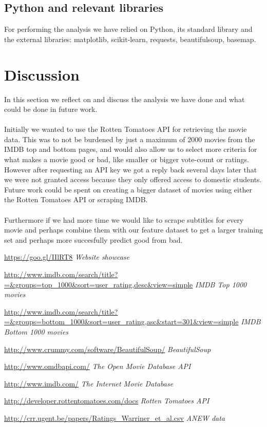 \documentclass{acm_proc_article-sp}
\begin{document}
\subsection{Python and relevant libraries}
For performing the analysis we have relied on Python, its standard library and the external libraries: matplotlib, scikit-learn, requests, beautifulsoup, basemap.

\section{Discussion}
In this section we reflect on and discuss the analysis we have done and what could be done in future work.\\\\
Initially we wanted to use the Rotten Tomatoes API\cite{tomatoes} for retrieving the movie data. This was to not be burdened by just a maximum of 2000 movies from the IMDB top and bottom pages, and would also allow us to select more criteria for what makes a movie good or bad, like smaller or bigger vote-count or ratings. However after requesting an API key we got a reply back several days later that we were not granted access because they only offered access to domestic students. Future work could be spent on creating a bigger dataset of movies using either the Rotten Tomatoes API or scraping IMDB.\\\\

Furthermore if we had more time we would like to scrape subtitles for every movie and perhaps combine them with our feature dataset to get a larger training set and perhaps more succesfully predict good from bad.



\begin{thebibliography}{9}

\url{https://goo.gl/IIlRT8}
\textit{Website showcase}

\url{http://www.imdb.com/search/title?=&groups=top_1000&sort=user_rating,desc&view=simple}
\textit{IMDB Top 1000 movies}

\url{http://www.imdb.com/search/title?=&groups=bottom_1000&sort=user_rating,asc&start=301&view=simple}
\textit{IMDB Bottom 1000 movies}

\url{http://www.crummy.com/software/BeautifulSoup/}
\textit{BeautifulSoup}

\url{http://www.omdbapi.com/}
\textit{The Open Movie Database API}

\url{http://www.imdb.com/}
\textit{The Internet Movie Database}

\url{http://developer.rottentomatoes.com/docs}
\textit{Rotten Tomatoes API}

\url{http://crr.ugent.be/papers/Ratings_Warriner_et_al.csv}
\textit{ANEW data}

\end{thebibliography}
\end{document}
